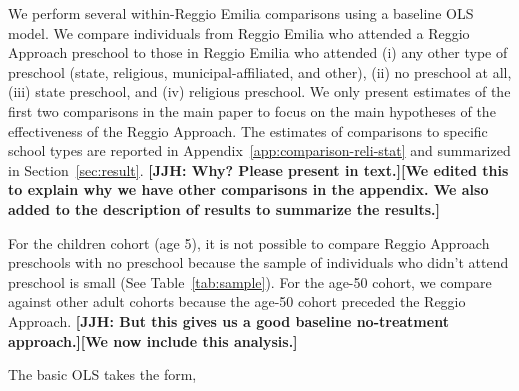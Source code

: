 We perform several within-Reggio Emilia comparisons using a baseline OLS model. We compare individuals from Reggio Emilia who attended a Reggio Approach preschool to those in Reggio Emilia who attended (i) any other type of preschool (state, religious, municipal-affiliated, and other), (ii) no preschool at all, (iii) state preschool, and (iv) religious preschool. We only present estimates of the first two comparisons in the main paper to focus on the main hypotheses of the effectiveness of the Reggio Approach. The estimates of comparisons to specific school types are reported in Appendix~\ref{app:comparison-reli-stat} and summarized in Section~\ref{sec:result}. \textbf{[JJH: Why? Please present in text.][We edited this to explain why we have other comparisons in the appendix. We also added to the description of results to summarize the results.]} 

For the children cohort (age 5), it is not possible to compare Reggio Approach preschools with no preschool because the sample of individuals who didn't attend preschool is small (See Table~\ref{tab:sample}). For the age-50 cohort, we compare against other adult cohorts because the age-50 cohort preceded the Reggio Approach. \textbf{[JJH: But this gives us a good baseline no-treatment approach.][We now include this analysis.]}

The basic OLS takes the form,

